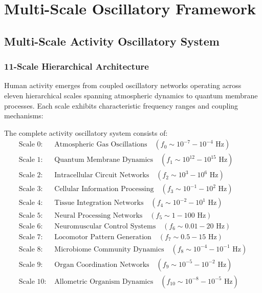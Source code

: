 \section{Multi-Scale Oscillatory Framework}

\subsection{Multi-Scale Activity Oscillatory System}

\subsubsection{11-Scale Hierarchical Architecture}

Human activity emerges from coupled oscillatory networks operating across eleven hierarchical scales spanning atmospheric dynamics to quantum membrane processes. Each scale exhibits characteristic frequency ranges and coupling mechanisms:

\begin{definition}
The complete activity oscillatory system consists of:
\begin{align}
\text{Scale 0: } &\text{Atmospheric Gas Oscillations} \quad (f_0 \sim 10^{-7}-10^{-4} \text{ Hz}) \label{eq:atmospheric} \\
\text{Scale 1: } &\text{Quantum Membrane Dynamics} \quad (f_1 \sim 10^{12}-10^{15} \text{ Hz}) \label{eq:quantum} \\
\text{Scale 2: } &\text{Intracellular Circuit Networks} \quad (f_2 \sim 10^{3}-10^{6} \text{ Hz}) \label{eq:intracellular} \\
\text{Scale 3: } &\text{Cellular Information Processing} \quad (f_3 \sim 10^{-1}-10^{2} \text{ Hz}) \label{eq:cellular} \\
\text{Scale 4: } &\text{Tissue Integration Networks} \quad (f_4 \sim 10^{-2}-10^{1} \text{ Hz}) \label{eq:tissue} \\
\text{Scale 5: } &\text{Neural Processing Networks} \quad (f_5 \sim 1-100 \text{ Hz}) \label{eq:neural} \\
\text{Scale 6: } &\text{Neuromuscular Control Systems} \quad (f_6 \sim 0.01-20 \text{ Hz}) \label{eq:neuromuscular} \\
\text{Scale 7: } &\text{Locomotor Pattern Generation} \quad (f_7 \sim 0.5-15 \text{ Hz}) \label{eq:locomotor} \\
\text{Scale 8: } &\text{Microbiome Community Dynamics} \quad (f_8 \sim 10^{-4}-10^{-1} \text{ Hz}) \label{eq:microbiome} \\
\text{Scale 9: } &\text{Organ Coordination Networks} \quad (f_9 \sim 10^{-5}-10^{-2} \text{ Hz}) \label{eq:organ} \\
\text{Scale 10: } &\text{Allometric Organism Dynamics} \quad (f_{10} \sim 10^{-8}-10^{-5} \text{ Hz}) \label{eq:allometric}
\end{align}
\end{definition}

